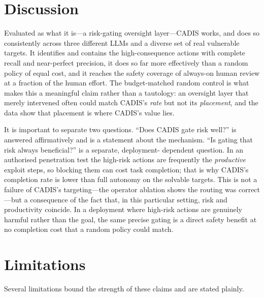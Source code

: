 \documentclass[11pt]{article}
\begin{document}
\section{Discussion}\label{sec:discussion}
Evaluated as what it is---a risk-gating oversight layer---CADIS works, and does so consistently across
three different LLMs and a diverse set of real vulnerable targets. It identifies and contains the
high-consequence actions with complete recall and near-perfect precision, it does so far more
effectively than a random policy of equal cost, and it reaches the safety coverage of always-on human
review at a fraction of the human effort. The budget-matched random control is what makes this a
meaningful claim rather than a tautology: an oversight layer that merely intervened often could match
CADIS's \emph{rate} but not its \emph{placement}, and the data show that placement is where CADIS's value
lies.

It is important to separate two questions. ``Does CADIS gate risk well?'' is answered affirmatively and
is a statement about the mechanism. ``Is gating that risk always beneficial?'' is a separate, deployment-
dependent question. In an authorised penetration test the high-risk actions are frequently the
\emph{productive} exploit steps, so blocking them can cost task completion; that is why CADIS's
completion rate is lower than full autonomy on the solvable targets. This is not a failure of CADIS's
targeting---the operator ablation shows the routing was correct---but a consequence of the fact that, in
this particular setting, risk and productivity coincide. In a deployment where high-risk actions are
genuinely harmful rather than the goal, the same precise gating is a direct safety benefit at no
completion cost that a random policy could match.

\section{Limitations}\label{sec:limitations}
Several limitations bound the strength of these claims and are stated plainly.
\end{document}
